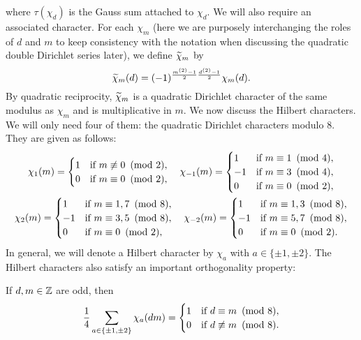 \documentclass[12pt,reqno,oneside]{amsart}
\begin{document}
    where $\tau(\chi_{d})$ is the Gauss sum attached to $\chi_{d}$. We will also require an associated character. For each $\chi_{m}$ (here we are purposely interchanging the roles of $d$ and $m$ to keep consistency with the notation when discussing the quadratic double Dirichlet series later), we define $\widetilde{\chi}_{m}$ by
    \[
        \widetilde{\chi}_{m}(d) = (-1)^{\frac{m^{(2)}-1}{2}\frac{d^{(2)}-1}{2}}\chi_{m}(d).
    \]
    By quadratic reciprocity, $\widetilde{\chi}_{m}$ is a quadratic Dirichlet character of the same modulus as $\chi_{m}$ and is multiplicative in $m$. We now discuss the Hilbert characters. We will only need four of them: the quadratic Dirichlet characters modulo $8$. They are given as follows:
    \begin{gather*}
        \chi_{1}(m) = \begin{cases} 1 &\text{if $m \not\equiv 0 \ \left(\text{mod }2\right)$}, \\ 0 &\text{if $m \equiv 0 \ \left(\text{mod }2\right)$}, \end{cases} \quad \chi_{-1}(m) = \begin{cases} 1 &\text{if $m \equiv 1 \ \left(\text{mod }4\right)$}, \\ -1 &\text{if $m \equiv 3 \ \left(\text{mod }4\right)$}, \\ 0 &\text{if $m \equiv 0 \ \left(\text{mod }2\right)$}, \end{cases} \\ \chi_{2}(m) = \begin{cases} 1 &\text{if $m \equiv 1,7 \ \left(\text{mod }8\right)$}, \\ -1 &\text{if $m \equiv 3,5 \ \left(\text{mod }8\right)$}, \\ 0 &\text{if $m \equiv 0 \ \left(\text{mod }2\right)$}, \end{cases} \quad \chi_{-2}(m) = \begin{cases} 1 &\text{if $m \equiv 1,3 \ \left(\text{mod }8\right)$}, \\ -1 &\text{if $m \equiv 5,7 \ \left(\text{mod }8\right)$}, \\ 0 &\text{if $m \equiv 0 \ \left(\text{mod }2\right)$}. \end{cases}
    \end{gather*}
    In general, we will denote a Hilbert character by $\chi_{a}$ with $a \in \{\pm1,\pm2\}$. The Hilbert characters also satisfy an important orthogonality property:

    \begin{theorem}
        If $d,m \in \mathbb{Z}$ are odd, then
        \[
            \frac{1}{4}\sum_{a \in \{\pm1,\pm2\}}\chi_{a}(dm) = \begin{cases} 1 & \text{if $d \equiv m \ \left(\text{mod }8\right)$}, \\ 0 & \text{if $d \not\equiv m \ \left(\text{mod }8\right)$}. \end{cases}
        \]
    \end{theorem}
\end{document}
